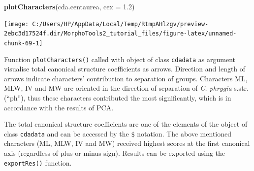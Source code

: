 \documentclass[
]{article}
\newenvironment{Shaded}{\begin{snugshade}}{\end{snugshade}}
\newcommand{\DataTypeTok}[1]{\textcolor[rgb]{0.13,0.29,0.53}{#1}}
\newcommand{\FloatTok}[1]{\textcolor[rgb]{0.00,0.00,0.81}{#1}}
\newcommand{\KeywordTok}[1]{\textcolor[rgb]{0.13,0.29,0.53}{\textbf{#1}}}
\newcommand{\NormalTok}[1]{#1}
\begin{document}
\begin{Shaded}
\begin{Highlighting}[]
\KeywordTok{plotCharacters}\NormalTok{(cda.centaurea, }\DataTypeTok{cex =} \FloatTok{1.2}\NormalTok{)}
\end{Highlighting}
\end{Shaded}

\begin{center}\texttt{[image: C:/Users/HP/AppData/Local/Temp/RtmpAHlzgv/preview-2ebc3d17524f.dir/MorphoTools2\_tutorial\_files/figure-latex/unnamed-chunk-69-1]} \end{center}

Function \texttt{plotCharacters()} called with object of class
\texttt{cdadata} as argument visualise total canonical structure
coefficients as arrows. Direction and length of arrows indicate
characters' contribution to separation of groups. Characters ML, MLW, IV
and MW are oriented in the direction of separation of \emph{C. phrygia}
s.str. (``ph''), thus these characters contributed the most
significantly, which is in accordance with the results of PCA.

The total canonical structure coefficients are one of the elements of
the object of class \texttt{cdadata} and can be accessed by the
\texttt{\$} notation. The above mentioned characters (ML, MLW, IV and
MW) received highest scores at the first canonical axis (regardless of
plus or minus sign). Results can be exported using the
\texttt{exportRes()} function.
\end{document}
